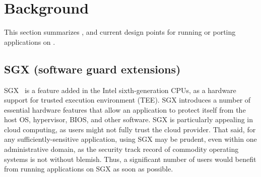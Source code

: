 
\section{Background}
\label{sec:sgx:background}

This section summarizes \sgx{},
and current design points for running or porting applications on \sgx{}.


\subsection{SGX (software guard extensions)}
\label{sec:sgx:background:sgx}


SGX~\cite{intelsgx} is a feature added in the Intel sixth-generation CPUs,
as a hardware support for trusted execution environment (TEE).
SGX introduces a number of essential hardware features that allow an application
to protect itself from the host OS, hypervisor, BIOS, and other software.
SGX is particularly appealing in cloud computing, as users 
might not fully trust the cloud provider.
That said, for any sufficiently-sensitive application, using SGX may be prudent,
even within one administrative domain,
as the security track record of commodity operating systems is not without blemish.
Thus, a significant number of users would benefit from running applications on SGX as soon as possible.




